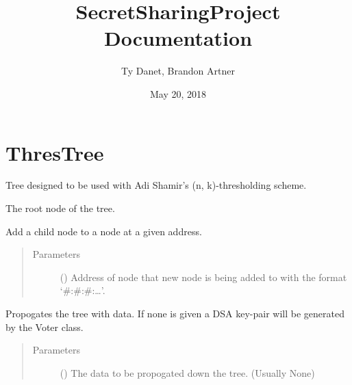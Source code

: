 \documentclass[letterpaper,10pt,english]{sphinxmanual}
\title{SecretSharingProject Documentation}
\date{May 20, 2018}
\author{Ty Danet, Brandon Artner}
\begin{document}
\maketitle
\sphinxtableofcontents
{}\label{\detokenize{index::doc}}


\chapter{ThresTree}
\label{\detokenize{index:module-ThresTree}}\label{\detokenize{index:secret-sharing-capstone}}\label{\detokenize{index:threstree}}

\begin{fulllineitems}
\label{\detokenize{index:ThresTree.ThresTree}}
Tree designed to be used with Adi Shamir’s (n, k)-thresholding scheme.

\begin{fulllineitems}
\label{\detokenize{index:ThresTree.ThresTree.root}}
 \textendash{} The root node of the tree.

\end{fulllineitems}


\begin{fulllineitems}
\label{\detokenize{index:ThresTree.ThresTree.addChild}}
Add a child node to a node at a given address.
\begin{quote}\begin{description}
\item[{Parameters}] \leavevmode
{} () \textendash{} Address of node that new node is being added to with the format ‘\#:\#:\#:…’.

\end{description}\end{quote}

\end{fulllineitems}


\begin{fulllineitems}
\label{\detokenize{index:ThresTree.ThresTree.propagate}}
Propogates the tree with data. If none is given a DSA key-pair will be generated by the Voter class.
\begin{quote}\begin{description}
\item[{Parameters}] \leavevmode
{} () \textendash{} The data to be propogated down the tree. (Usually None)


\end{description}
\end{quote}
\end{fulllineitems}
\end{fulllineitems}
\end{document}
